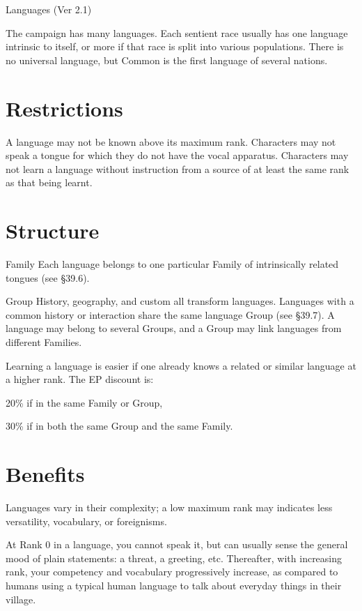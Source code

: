 \begin{Chapter}{Languages (Ver 2.1)}

The campaign has many languages.  Each sentient race usually has one
language intrinsic to itself, or more if that race is split into
various populations.  There is no universal language, but Common is
the first language of several nations.

\section{Restrictions}

A language may not be known above its maximum rank. Characters may not
speak a tongue for which they do not have the vocal apparatus.
Characters may not learn a language without instruction from a source
of at least the same rank as that being learnt.

\section{Structure}
Family Each language belongs to one particular Family of intrinsically
related tongues (see §39.6).

Group History, geography, and custom all transform languages.
Languages with a common history or interaction share the same language
Group (see §39.7). A language may belong to several Groups, and a
Group may link languages from different Families.

Learning a language is easier if one already knows a related or
similar language at a higher rank. The EP discount is:

\begin{Itemize}

\item 20\% if in the same Family or Group,  

\item 30\% if in both the same Group and the same Family.

\end{Itemize}

\section{Benefits}

Languages vary in their complexity; a low maximum rank may indicates
less versatility, vocabulary, or foreignisms.

At Rank 0 in a language, you cannot speak it, but can usually sense
the general mood of plain statements: a threat, a greeting, etc.
Thereafter, with increasing rank, your competency and vocabulary
progressively increase, as compared to humans using a typical human
language to talk about everyday things in their village.


\end{Chapter}
